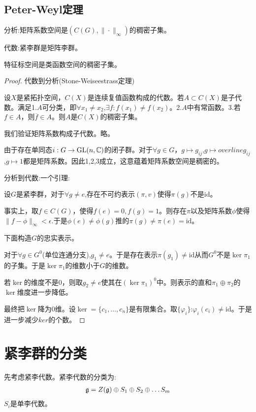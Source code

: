 \subsection*{Peter-Weyl定理}
\begin{theorem}
    分析:矩阵系数空间是$(C(G),\|\cdot\|_\infty)$的稠密子集。

    代数:紧李群是矩阵李群。
\end{theorem}
\begin{corollary}
    特征标空间是类函数空间的稠密子集。
\end{corollary}
\begin{proof}
    代数到分析(Stone-Weiseestrass定理)

    设$X$是紧拓扑空间，$C(X)$是连续复值函数构成的代数。若$A \subset C(X)$是子代数。满足1.$A$可分类，即$\forall x_1 \neq x_2$,$\exists f:f(x_1)\neq f(x_2)$。2.$A$中有常函数。3.若$f \in A$，则$\overline{f}\in A$。则$A$是$C(X)$的稠密子集。

    我们验证矩阵系数构成子代数。略。

    由于存在单同态$i:G \to \mathrm{GL}(n,\mathbb{C})$的闭子群。对于$\forall g\in G$，$g \mapsto g_{ij}$,$g \mapsto overline{g_{ij}}$,$g \mapsto 1$都是矩阵系数。因此1,2,3成立，这意蕴着矩阵系数空间是稠密的。

    分析到代数:一个引理:
    \begin{lemma}
        设$G$是紧李群，对于$\forall g \neq e$,存在不可约表示$(\pi,v)$使得$\pi(g)$不是$\mathrm{id}$。
    \end{lemma}
    事实上，取$f \in C(G)$，使得$f(e)=0,f(g)=1$。则存在$\pi$以及矩阵系数$\phi$使得$\|f-\phi\|_{\infty}<\epsilon$.于是$\phi(e)\neq \phi(g)$推的$\pi(g)\neq \pi(e)=\mathrm{id}$。

    下面构造$G$的忠实表示。

    对于$\forall g \in G^0$(单位连通分支),$g_1 \neq e$。于是存在表示$\pi(g_1)\neq \mathrm{id}$从而$G^0$不是$\ker \pi_1$的子集。于是$\ker \pi_1$的维数小于$G$的维数。

    若$\ker$的维度不是$0$，则取$g_2 \neq e$使其在$(\ker \pi_1)^0$中。则表示的直和$\pi_1\oplus \pi_2$的$\ker$维度进一步降低。

    最终把$\ker$降为$0$维。设$\ker=\{c_1,\dots,c_n\}$是有限集合。取$\{\varphi_i\}$:$\varphi_i(c_i)\neq \mathrm{id}$。于是进一步减少$ker$的个数。
    \end{proof}
    \section{紧李群的分类}
    先考虑紧李代数。紧李代数的分类为:
    \begin{align*}
        \mathfrak{g}=Z(\mathfrak{g})\oplus S_1 \oplus S_2 \oplus \dots S_m
    \end{align*}
    $S_i$是单李代数。

